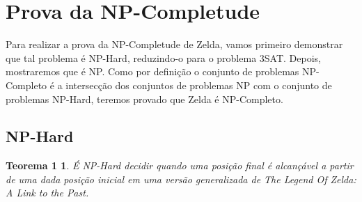 \section{Prova da NP-Completude}

Para realizar a prova da NP-Completude de Zelda, vamos primeiro demonstrar que tal problema é
NP-Hard, reduzindo-o para o problema 3SAT. Depois, mostraremos que é NP. Como por definição o conjunto
de problemas NP-Completo é a intersecção dos conjuntos de problemas NP com o conjunto de problemas NP-Hard,
teremos provado que Zelda é NP-Completo.

\subsection{NP-Hard}

\newtheorem*{theorem}{Teorema 1}

\begin{theorem}
    É NP-Hard decidir quando uma posição final é alcançável a partir de uma dada posição
    inicial em uma versão generalizada de The Legend Of Zelda: A Link to the Past.
\end{theorem}


